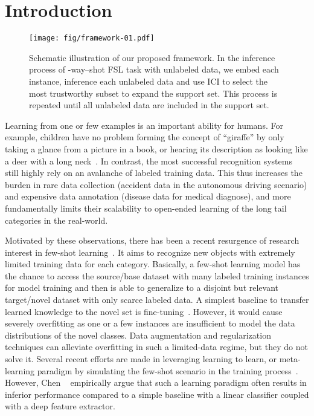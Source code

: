 \documentclass[10pt,letterpaper,twocolumn]{article}
\begin{document}
\section{Introduction}
\begin{figure*}[hbt!]
\begin{centering}
\texttt{[image: fig/framework-01.pdf]}
\par\end{centering}
\caption{\label{fig:framework} 
Schematic illustration of our proposed framework. 
In the inference process of -way--shot FSL task with unlabeled data, 
we embed each instance, 
inference each unlabeled data and use ICI to select the most trustworthy subset to expand the support set. 
This process is repeated until all unlabeled data are included in the support set.}
\end{figure*}

Learning from one or few examples is an important ability for humans.
For example, children have no problem forming the concept of ``giraffe'' by only taking a glance from a picture in a book, 
or hearing its description as looking like a deer with a long neck~\cite{zhang2017learning}.
In contrast, the most successful recognition systems~\cite{krizhevsky2012imagenet,simonyan2014very,he2016deep,huang2017densely} still highly rely on an avalanche of labeled training data.
This thus increases the burden in rare data collection (\eg accident data in the autonomous driving scenario) and
expensive data annotation (\eg disease data for medical diagnose), 
and more fundamentally limits their scalability to open-ended learning of the long tail categories in the real-world.

Motivated by these observations, there has been a recent resurgence of research interest in few-shot learning~\cite{finn2017model,snell2017prototypical,sung2018learning,vinyals2016matching}.
It aims to recognize new objects with extremely limited training data for each category. 
Basically, a few-shot learning model has the chance to access the source/base dataset with many labeled training instances for model training and then is able to generalize to a disjoint but relevant target/novel 
dataset
with only scarce labeled data.
A simplest baseline to transfer learned knowledge to the novel set is fine-tuning~\cite{yosinski2014transferable}.
However, it would cause severely overfitting as one or a few instances are insufficient to model the data distributions of the novel classes.
Data augmentation and regularization techniques can alleviate overfitting in such a limited-data regime, but they do not solve it.
Several recent efforts are made in leveraging learning to learn, or meta-learning paradigm by simulating the few-shot scenario in the training process~\cite{lemke2015metalearning}. 
However, Chen \etal~\cite{DBLP:journals/corr/abs-1904-04232} empirically argue that such a learning paradigm often results in inferior performance compared to a simple baseline with a linear classifier coupled with a deep feature extractor.
\end{document}
